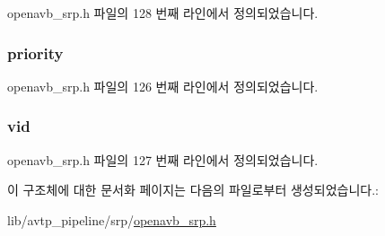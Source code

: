 openavb\+\_\+srp.\+h 파일의 128 번째 라인에서 정의되었습니다.

\subsubsection[{\texorpdfstring{priority}{priority}}]{ priority}\hypertarget{struct_sr_class_parameters_a311f8b040417772c36534cb9ba9612d5}{}\label{struct_sr_class_parameters_a311f8b040417772c36534cb9ba9612d5}


openavb\+\_\+srp.\+h 파일의 126 번째 라인에서 정의되었습니다.

\subsubsection[{\texorpdfstring{vid}{vid}}]{ vid}\hypertarget{struct_sr_class_parameters_a81f2d356205ff6eadadbb549b089018a}{}\label{struct_sr_class_parameters_a81f2d356205ff6eadadbb549b089018a}


openavb\+\_\+srp.\+h 파일의 127 번째 라인에서 정의되었습니다.



이 구조체에 대한 문서화 페이지는 다음의 파일로부터 생성되었습니다.\+:\begin{DoxyCompactItemize}
\item 
lib/avtp\+\_\+pipeline/srp/\hyperlink{openavb__srp_8h}{openavb\+\_\+srp.\+h}\end{DoxyCompactItemize}
